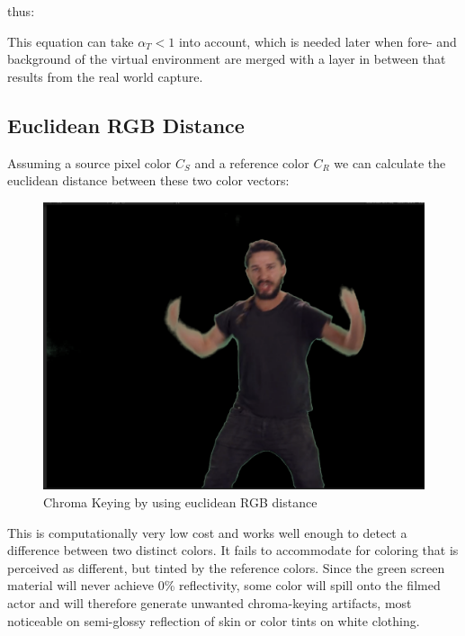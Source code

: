 
thus:


This equation can take $\alpha_T < 1$ into account, which is needed later when 
fore- and background of the virtual environment are merged with a layer in 
between that results from the real world capture.

\subsection{Euclidean RGB Distance}
Assuming a source pixel color $C_S$ and a reference color $C_R$ we can 
calculate the euclidean distance between these two color vectors:

\begin{figure}[htb]
	\includegraphics[width=\textwidth]{_raw_resources/Comparison_RGB_color.png}
	\caption{Chroma Keying by using euclidean RGB distance}
	\label{fig:chroma:euclidean:rgb}
\end{figure}

This is computationally very low cost and works well enough to detect a 
difference between two distinct colors. It fails to accommodate for coloring 
that is perceived as different, but tinted by the reference colors. Since the 
green screen material will never achieve 0\% reflectivity, some color will 
spill onto the filmed actor and will therefore generate unwanted chroma-keying 
artifacts, most noticeable on semi-glossy reflection of skin or color tints on 
white clothing.

